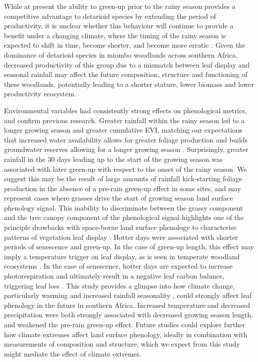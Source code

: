 \documentclass[11pt,a4paper]{article}
\begin{document}
While at present the ability to green-up prior to the rainy season provides a
competitive advantage to detarioid species by extending the period of
productivity, it is unclear whether this behaviour will continue to provide a
benefit under a changing climate, where the timing of the rainy season is
expected to shift in time, become shorter, and become more erratic
\citep{Shongwe2011, Pohl2017, Wainwright2021}. Given the dominance of detarioid
species in miombo woodlands across southern Africa, decreased productivity of
this group due to a mismatch between leaf display and seasonal rainfall may
affect the future composition, structure and functioning of these woodlands,
potentially leading to a shorter stature, lower biomass and lower productivity
ecosystem.

Environmental variables had consistently strong effects on phenological
metrics, and confirm previous research. Greater rainfall within the rainy
season led to a longer growing season and greater cumulative EVI, matching our
expectations that increased water availability allows for greater foliage
production and builds groundwater reserves allowing for a longer growing season
\citep{Adole2018a}. Surprisingly, greater rainfall in the 30 days leading up to
the start of the growing season was associated with later green-up with respect
to the onset of the rainy season. We suggest this may be the result of large
amounts of rainfall kick-starting foliage production in the absence of a
pre-rain green-up effect in some sites, and may represent cases where grasses
drive the start of growing season land surface phenology signal. This inability
to discriminate between the grassy component and the tree canopy component of
the phenological signal highlights one of the principle drawbacks with
space-borne land surface phenology to characterise patterns of vegetation leaf
display \citep{Archibald2007}. Hotter days were associated with shorter periods
of senescence and green-up. In the case of green-up length, this effect may
imply a temperature trigger on leaf display, as is seen in temperate woodland
ecosystems \citep{Flynn2018}. In the case of senescence, hotter days are
expected to increase photorespiration and ultimately result in a negative leaf
carbon balance, triggering leaf loss \citep{Warren2011, Marin2019}. This study
provides a glimpse into how climate change, particularly warming \citep{IPCC}
and increased rainfall seasonality \citep{Wainwright2021}, could strongly
affect leaf phenology in the future in southern Africa. Increased temperature
and decreased precipitation were both strongly associated with decreased
growing season length, and weakened the pre-rain green-up effect. Future
studies could explore further how climate extremes affect land surface
phenology, ideally in combination with measurements of composition and
structure, which we expect from this study might mediate the effect of climate
extremes.
\end{document}
